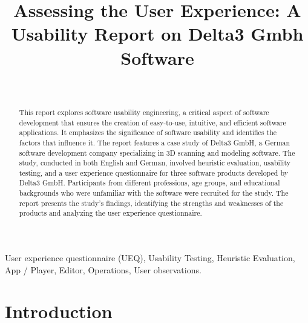 \documentclass[conference,onecolumn]{IEEEtran}
\begin{document}
\title{Assessing the User Experience: A Usability Report on Delta3 Gmbh Software\\}

\author{\\

}

\maketitle
		

\begin{abstract}
    This report explores software usability engineering, a critical aspect of software development that ensures the creation of easy-to-use, intuitive, and efficient software applications. It emphasizes the significance of software usability and identifies the factors that influence it. The report features a case study of Delta3 GmbH, a German software development company specializing in 3D scanning and modeling software. The study, conducted in both English and German, involved heuristic evaluation, usability testing, and a user experience questionnaire for three software products developed by Delta3 GmbH. Participants from different professions, age groups, and educational backgrounds who were unfamiliar with the software were recruited for the study. The report presents the study's findings, identifying the strengths and weaknesses of the products and analyzing the user experience questionnaire.
\end{abstract}

\begin{IEEEkeywords}
	User experience questionnaire (UEQ), Usability Testing, Heuristic Evaluation, App / Player, Editor, Operations, User observations.
\end{IEEEkeywords}

\newpage
\tableofcontents

\newpage
\section{Introduction}
\end{document}
